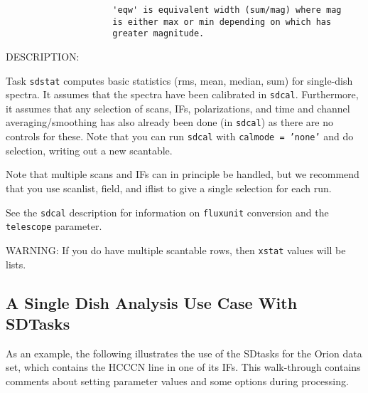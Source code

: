 \begin{itemize}
\begin{verbatim}
                     'eqw' is equivalent width (sum/mag) where mag
                     is either max or min depending on which has
                     greater magnitude.
\end{verbatim}
    
    DESCRIPTION:
    
    Task {\tt sdstat} computes basic statistics (rms, mean, median, 
    sum) for single-dish spectra.  It assumes that the spectra have
    been calibrated in {\tt sdcal}.  Furthermore, it assumes that any
    selection of scans, IFs, polarizations, and time and channel
    averaging/smoothing has also already been done (in {\tt sdcal}) as
    there are no controls for these.  Note that you can run {\tt sdcal}
    with {\tt calmode = 'none'} and do selection, writing out a new
    scantable.
    
    Note that multiple scans and IFs can in principle be handled, but
    we recommend that you use scanlist, field, and iflist to give a
    single selection for each run.
    
    See the {\tt sdcal} description for information on {\tt fluxunit} 
    conversion and the {\tt telescope} parameter.

    WARNING: If you do have multiple scantable rows, then {\tt xstat}
    values will be lists.
    
\end{itemize}

\subsection{A Single Dish Analysis Use Case With SDTasks}
\label{section:sd.sdtasks.usecase}

As an example, the following illustrates the use of the SDtasks for
the Orion data set, which contains the HCCCN line in one of its IFs.
This walk-through contains comments about setting parameter values
and some options during processing.

